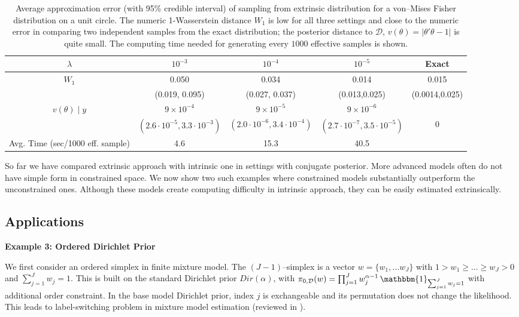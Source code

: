\documentclass[10pt]{article}
\newcommand{\mc}[1]{\mathcal{#1}}
\DeclareMathOperator{\1}{\mathbbm{1}}
\begin{document}
\begin{table}[H]
\centering
\small
\begin{tabular}{ c| c | c| c | c}
  \hline			
  $\lambda$  &  $10^{-3}$ & $10^{-4}$ & $10^{-5}$ & Exact  \\
  \hline
  \hline
  $W_1$ & 0.050 & 0.034  & 0.014   & 0.015 \\
  
   &  (0.019, 0.095) &(0.027, 0.037) &  (0.013,0.025)  & (0.0014,0.025)\\
  
  \hline
  $v(\theta) \mid y$ 
  & $9\times 10^{-4} $ 
  & $9\times 10^{-5} $ 
  & $9\times 10^{-6} $ \\
  & $(2.6 \cdot 10^{-5}, 3.3\cdot 10^{-3})$& $(2.0 \cdot 10^{-6}, 3.4\cdot 10^{-4})$& $(2.7 \cdot 10^{-7}, 3.5\cdot 10^{-5})$& 0\\
  \hline
  Avg. Time (sec/1000 eff. sample) & 4.6 & 15.3 & 40.5 &    \\
  \hline  
\end{tabular}
\caption{Average approximation error (with 95\% credible interval) of sampling from extrinsic distribution for 
a von--Mises Fisher distribution on a unit circle. The numeric 1-Wasserstein distance $W_1$ is low for all three settings and close to the numeric error in comparing two independent samples from the exact distribution; the posterior distance to $\mc D$, $v(\theta)= |\theta'\theta-1|$ is quite small.  The computing time needed for generating every $1000$ effective samples is shown. \label{table_circle}}
\end{table}

So far we have compared extrinsic approach with intrinsic one in settings with conjugate posterior. More advanced models often do not have simple form in constrained space. We now show two such examples where constrained models substantially outperform the unconstrained ones. Although these models create computing difficulty in intrinsic approach, they can be easily estimated extrinsically.


\subsection{Applications}

{\bf Example 3: Ordered Dirichlet Prior}

We first consider an ordered simplex in finite mixture model. The $(J-1)$--simplex is a vector $w=\{w_1,\ldots w_J\}$ with $1> w_1 \ge \ldots \ge w_J > 0$ and $\sum_{j=1}^J w_j=1$. This is built on the standard Dirichlet prior $Dir(\alpha)$, with $
\pi_{0, \mc D}(w) = \prod_{j=1}^J w_j^{\alpha-1} \1_{\sum_{j=1}^J w_j=1}$ with additional order constraint. In the base model Dirichlet prior,  index $j$ is exchangeable and its permutation does not change the likelihood. This leads to label-switching problem in mixture model estimation (reviewed in \cite{jasra2005markov}).
\end{document}
